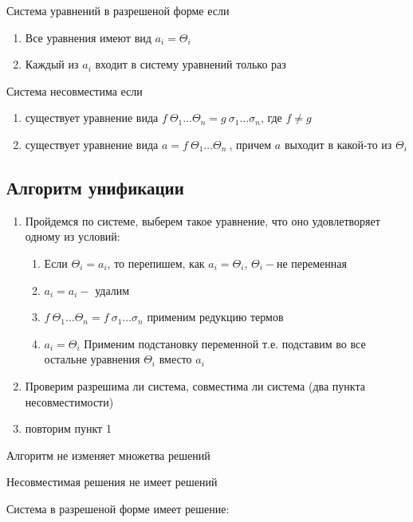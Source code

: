 		\begin{definition}Система уравнений в разрешеной форме если \end{definition}
			\begin{enumerate}
				\item Все уравнения имеют вид $a_i=\Theta_i$
				\item Каждый из $a_i$ входит в систему уравнений только раз
			\end{enumerate}
		\begin{definition}Система несовместима если\end{definition} 
		\begin{enumerate}
			\item существует уравнение вида $f\:\Theta_1\hdots\Theta_n=g\:\sigma_1\hdots\sigma_n$, где $f\neq g$
			\item существует уравнение вида $a=f\: \Theta_1\hdots\Theta_n\:$, причем $a$ выходит в какой-то из $\Theta_i$
		\end{enumerate}			
		\subsection{ Алгоритм унификации}
		\begin{enumerate}
		\item Пройдемся по системе, выберем такое уравнение, что оно удовлетворяет одному из условий:\begin{enumerate}
			\item Если $\Theta_i=a_i$, то перепишем, как $a_i=\Theta_i$, $\Theta_i-$не переменная
			\item $a_i=a_i-$ удалим
			\item $f\:\Theta_1\hdots\Theta_n=f\:\sigma_1\hdots\sigma_n$  применим редукцию термов 
			\item $a_i=\Theta_i$ Применим подстановку переменной т.е. подставим во все остальне уравнения $\Theta_i$ вместо $a_i$
		\end{enumerate}
		\item Проверим разрешима ли система, совместима ли система (два пункта несовместимости)
		\item повторим пункт 1 		
		\end{enumerate}
		
		\begin{statement} Алгоритм не изменяет множетва решений\end{statement}
		\begin{statement} Несовместимая решения не имеет решений\end{statement}
		\begin{statement} Система в разрешеной форме имеет решение:\end{statement}	
		
